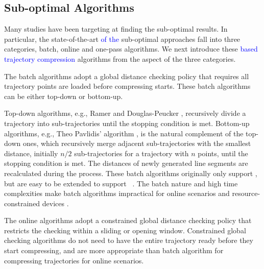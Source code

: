 \subsection{Sub-optimal Algorithms}
Many studies have been targeting at finding the sub-optimal results.
In particular, the state-of-the-art \textcolor{blue}{of the} sub-optimal \lsa approaches fall into three categories, \ie batch, online and one-pass algorithms.
We next introduce these \lsa \textcolor{blue}{based trajectory compression} algorithms from the aspect of the three categories.

The batch algorithms adopt a global distance checking policy that requires all trajectory points are loaded before compressing starts.
These batch algorithms can be either top-down or bottom-up.

Top-down algorithms, e.g., Ramer \cite{Ramer:Split} and Douglas-Peucker \cite{Douglas:Peucker}, recursively divide a trajectory into sub-trajectories until the stopping condition is met.
%
Bottom-up algorithms, e.g., Theo Pavlidis' algorithm \cite{Pavlidis:Segment}, is the natural complement of the top-down ones, which recursively merge adjacent sub-trajectories with the smallest distance, initially $n/2$  sub-trajectories for a trajectory with $n$ points, until the stopping condition is met.
%
The distances of newly generated line segments are recalculated during the process.
%
These batch algorithms originally only support \ped, but are easy to be extended to support \sed~\cite{Meratnia:Spatiotemporal}.
%
The batch nature and high time complexities make batch algorithms impractical for online scenarios and resource-constrained devices \cite{Lin:Operb}.


The online algorithms adopt a constrained global distance checking policy that restricts the checking within a sliding or opening window.
Constrained global checking algorithms do not need to have the entire trajectory ready before they start compressing, and are more appropriate than batch algorithm for compressing trajectories for online scenarios.

